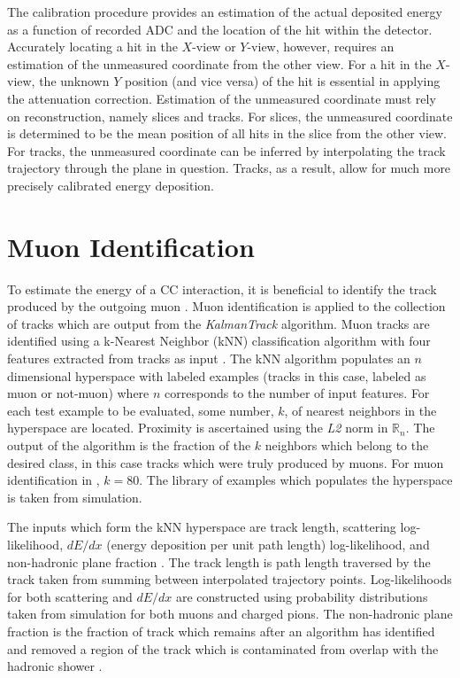 The calibration procedure provides an estimation of the actual deposited
energy as a function of recorded ADC and the location of the hit within
the detector.
Accurately locating a hit in the $X$-view or $Y$-view, however, requires
an estimation of the unmeasured coordinate from the other view.
For a hit in the $X$-view, the unknown $Y$ position (and vice versa) of the hit
is essential in applying the attenuation correction.
Estimation of the unmeasured coordinate must rely on reconstruction,
namely slices and tracks.
For slices, the unmeasured coordinate is determined to be the mean position
of all hits in the slice from the other view.
For tracks, the unmeasured coordinate can be inferred by interpolating the
track trajectory through the plane in question.
Tracks, as a result, allow for much more precisely calibrated energy deposition.

\section{Muon Identification}
\label{remid_section}
To estimate the energy of a \numu CC interaction, it is beneficial to identify
the track produced by the outgoing muon \cite{lein2015thesis}.
Muon identification is applied to the collection of tracks which are output
from the \textit{KalmanTrack} algorithm.
Muon tracks are identified using a k-Nearest Neighbor (kNN)
\cite{altman1992introduction} classification
algorithm with four features extracted from tracks as input
\cite{raddatz2016thesis}.
The kNN algorithm populates an $n$ dimensional hyperspace with labeled
examples (tracks in this case, labeled as muon or not-muon) where $n$
corresponds to the number of input features.
For each test example to be evaluated, some number, $k$, of nearest neighbors
in the hyperspace
are located.  Proximity is ascertained using the \textit{L2} norm in
$\mathbb{R}_n$.
The output of the algorithm is the fraction of the $k$ neighbors which belong
to the desired class, in this case tracks which were truly produced by muons.
For muon identification in \nova, $k = 80$.
The library of examples which populates the hyperspace is taken from
\nova simulation.

The inputs which form the kNN hyperspace are track length, scattering
log-likelihood, $dE/dx$ (energy deposition per unit
path length) log-likelihood, and non-hadronic plane fraction
\cite{raddatz2016thesis}.
The track length is path length traversed by the track taken from
summing between interpolated trajectory points.
Log-likelihoods for both scattering and $dE/dx$ are constructed using
probability distributions taken from simulation for both muons and
charged pions.
The non-hadronic plane fraction is the fraction of track which remains
after an algorithm has identified and removed a region of the track
which is contaminated from overlap with the hadronic shower
\cite{sachdev2015thesis}.

